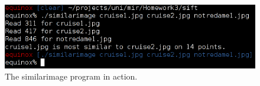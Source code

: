 \documentclass[10pt,a4paper]{article}
\begin{document}
\begin{figure}
	\centering
	\includegraphics[width=\textwidth]{screenshot}
	\caption{The similarimage program in action.}
	\label{fig:similarimage}
\end{figure}
\end{document}

